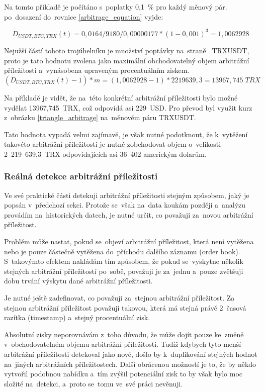 \documentclass[thesis=B,czech]{FITthesis}[2019/03/21]
\begin{document}
Na tomto příkladě je počítáno s~poplatky 0,1~\% pro každý měnový pár. po~dosazení do~rovnice \ref{arbitrage_equation} vyjde:

\[D_{USDT,BTC,TRX}(t) = 0,0164 / 9180 / 0,00000177 * (1 - 0,001)^3 = 1,0062928 \]

Nejužší částí tohoto trojúhelníku je množství poptávky na~straně \linebreak~TRXUSDT, proto je tato hodnotu zvolena jako maximální obchodovatelný objem arbitrážní příležitosti a~vynásobena upraveným procentuálním ziskem. 
\[(D_{USDT,BTC,TRX}(t) - 1) * m = (1,0062928 - 1) * 2219639,3 = 13967,745\;TRX\]

Na příkladě je vidět, že na~této konkrétní arbitrážní příležitosti bylo možné vydělat 13967,745~TRX, což odpovídá asi 229~USD. Pro převod byl využit kurz z~obrázku \ref{triangle_arbitrage} na~měnovém páru TRXUSDT. 

Tato hodnota vypadá velmi zajímavě, je však nutné podotknout, že \linebreak k~vytěžení takovéto arbitrážní příležitosti je nutné zobchodovat objem o~velikosti 2~219~639,3~TRX odpovídajících asi 36~402 americkým dolarům. 

\subsubsection{Reálná detekce arbitrážní příležitosti}
Ve své praktické části detekuji arbitrážní příležitosti stejným způsobem, jaký je popsán v~předchozí sekci. Protože se~však na~data koukám později a~analýzu provádím na~historických datech, je nutné určit, co považuji za~novou arbitrážní příležitost.

Problém může nastat, pokud se~objeví arbitrážní příležitost, která není vytěžena nebo je pouze částečně vytěžena do~příchodu dalšího záznamu (order book). S~takovýmto efektem nakládám tím způsobem, že pokud se~vyskytne několik stejných arbitrážní příležitostí po~sobě, považuji je za~jednu a~pouze zvětšuji dobu trvání výskytu dané arbitrážní příležitosti.

Je nutné ještě zadefinovat, co považuji za~stejnou arbitrážní příležitost. Za stejnou arbitrážní příležitost považuji takovou, která má stejná právě 2~časová razítka (timestamp) a~stejný procentuální zisk. 

Absolutní zisky neporovnávám z~toho důvodu, že může dojít pouze ke~změně v~obchodovatelném objemu arbitrážní příležitosti. Tudíž kdybych tyto menší arbitrážní příležitosti detekoval jako nové, došlo by k~duplikování stejných hodnot na~jiných arbitrážních příležitostech. Další obrácenou možností je to, že by někdo vytvořil podobnou nabídku a~tím zvýšil potenciální zisk to by však bylo moc složité na~detekci, a~proto se~tomu ve~své práci nevěnuji. 
\end{document}
